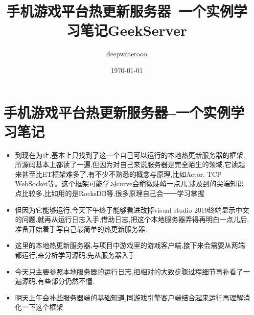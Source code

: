 \documentclass[9pt, b5paper]{article}
\author{deepwaterooo}
\date{\today}
\title{手机游戏平台热更新服务器--一个实例学习笔记GeekServer}
\begin{document}
\maketitle
\tableofcontents


\section{手机游戏平台热更新服务器--一个实例学习笔记}
\label{sec-1}
\begin{itemize}
\item 到现在为止,基本上只找到了这一个自己可以运行的本地热更新服务器的框架.所源码基本上都读了一遍,但因为对自己来说服务器是完全陌生的领域,它读起来甚至比ET框架难多了,有不少不熟悉的概念与原理,比如Actor, TCP　WebSocket等。这个框架可能学习curve会稍微陡峭一点儿,涉及到的尖端知识点比较多,比如用的是RocksDB等,很多原理自己会一一学习掌握
\item 但因为它能够运行,今天下午终于能够看进改掉visual studio 2019终端显示中文的问题.就再从运行日志入手,借助日志,把这个本地服务器弄得再明白一点儿后,准备开始着手写自己最简单的热更新服务器.
\item 这里的本地热更新服务器,与项目中游戏里的游戏客户端,接下来会需要从两端都运行,来分析学习源码.先从服务器入手
\item 今天只主要参照本地服务器的运行日志,把相对的大致步骤过程细节再补看了一遍源码.有些部分仍然不懂.
\item 明天上午会补些服务器端的基础知道,同游戏引擎客户端结合起来运行再理解消化一下这个框架
\end{itemize}
\end{document}
